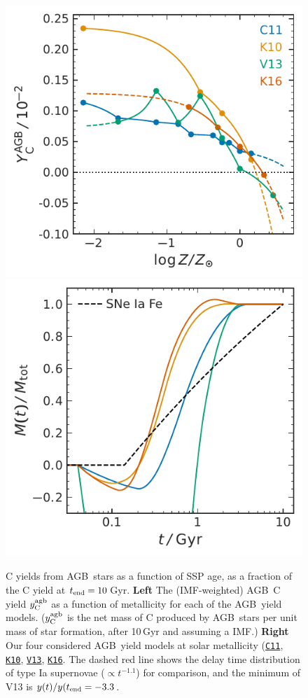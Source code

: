\documentclass[fleqn,
usenatbib]{mnras}
\newcommand{\cxi}{\texttt{\hyperlink{C11}{C11}}}
\newcommand{\kx}{\texttt{\hyperlink{K10}{K10}}}
\newcommand{\kxvi}{\texttt{\hyperlink{K16}{K16}}}
\newcommand{\vxiii}{\texttt{\hyperlink{V13}{V13}}}
\newcommand{\agb}{AGB}
\newcommand{\imf}{IMF}
\newcommand{\ssp}{SSP}
\newcommand{\Ycagb}{\ensuremath{y_{\rm C}^{\rm agb}}}
\begin{document}
\begin{figure}
    \centering
    \includegraphics{y_agb_vs_z.pdf}
    \includegraphics{y_agb_vs_t.pdf}

    \caption[]{ C yields from \agb\ stars as a function of \ssp{} age, as a fraction of the C yield at $t_{\rm end}=10\,$Gyr. 
\textbf{Left} The (\imf-weighted) \agb\ C yield $\Ycagb$ as a function of metallicity for each of the \agb\ yield models. ($\Ycagb$ is the net mass of C produced by \agb\ stars per unit mass of star formation, after 10\,Gyr and assuming a \citealt{kroupa01} \imf.)
    \textbf{Right} Our four considered \agb\ yield models at solar metallicity (\cxi{}, \kx{}, \vxiii{}, \kxvi{}. The dashed red line shows the delay time distribution of type Ia supernovae ($\propto t^{-1.1}$) for comparison, and the minimum of V13 is $y(t)/y(t_{\rm end}=-3.3$. 
}

    \label{fig:agb-ssp}

\end{figure}
\end{document}
